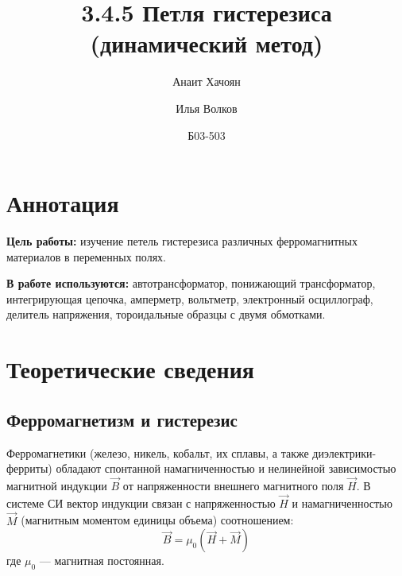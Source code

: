 \documentclass[12pt, letterpaper]{article}
\title{3.4.5 Петля гистерезиса (динамический метод)}
\author{Анаит Хачоян 
\and 
Илья Волков}
\date{Б03-503}
\begin{document}
\maketitle

\section*{Аннотация}

	\textbf{Цель работы:} изучение петель гистерезиса различных ферромагнитных материалов в переменных полях.

	\textbf{В работе используются:} автотрансформатор, понижающий трансформатор, интегрирующая цепочка, амперметр, вольтметр, электронный
осциллограф, делитель напряжения, тороидальные образцы с двумя обмотками.

\section*{Теоретические сведения}

\subsection*{Ферромагнетизм и гистерезис}
Ферромагнетики (железо, никель, кобальт, их сплавы, а также диэлектрики-ферриты) обладают спонтанной намагниченностью и нелинейной зависимостью магнитной индукции $\vec{B}$ от напряженности внешнего магнитного поля $\vec{H}$. В системе СИ вектор индукции связан с напряженностью $\vec{H}$ и намагниченностью $\vec{M}$ (магнитным моментом единицы объема) соотношением:
\begin{equation}
    \vec{B} = \mu_0 (\vec{H} + \vec{M})
\end{equation}
где $\mu_0$ — магнитная постоянная.
\end{document}

